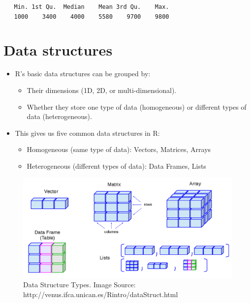 \documentclass[
  letterpaper,
  DIV=11,
  numbers=noendperiod]{scrreprt}
\providecommand{\tightlist}{%
  \setlength{\itemsep}{0pt}\setlength{\parskip}{0pt}}\usepackage{longtable,booktabs,array}
\begin{document}
\begin{verbatim}
   Min. 1st Qu.  Median    Mean 3rd Qu.    Max. 
   1000    3400    4000    5580    9700    9800 
\end{verbatim}

\section{Data structures}\label{data-structures}

\begin{itemize}
\item
  R's basic data structures can be grouped by:

  \begin{itemize}
  \tightlist
  \item
    Their dimensions (1D, 2D, or multi-dimensional).
  \item
    Whether they store one type of data (homogeneous) or different types
    of data (heterogeneous).
  \end{itemize}
\item
  This gives us five common data structures in R:

  \begin{itemize}
  \tightlist
  \item
    Homogeneous (same type of data): Vectors, Matrices, Arrays
  \item
    Heterogeneous (different types of data): Data Frames, Lists
  \end{itemize}
\end{itemize}

\begin{figure}[H]

{\centering \includegraphics[width=1\textwidth,height=\textheight]{fig/3_dataStructures.png}

}

\caption{Data Structure Types. Image Source:
http://venus.ifca.unican.es/Rintro/dataStruct.html}

\end{figure}%
\end{document}
